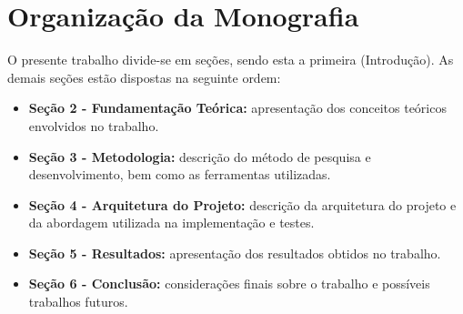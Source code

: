 \section{Organização da Monografia}

O presente trabalho divide-se em seções, sendo esta a primeira (Introdução). As demais seções estão dispostas na seguinte ordem: 
\begin{itemize}[noitemsep]
	\item \textbf{Seção 2 - Fundamentação Teórica:} apresentação dos conceitos teóricos envolvidos no trabalho. 
	\item \textbf{Seção 3 - Metodologia: } descrição do método de pesquisa e desenvolvimento, bem como as ferramentas utilizadas. 
	\item \textbf{Seção 4 - Arquitetura do Projeto:} descrição da arquitetura do projeto e da abordagem utilizada na implementação e testes. 
	\item \textbf{Seção 5 - Resultados:} apresentação dos resultados obtidos no trabalho.
	\item \textbf{Seção 6 - Conclusão:} considerações finais sobre o trabalho e possíveis trabalhos futuros.
\end{itemize}



